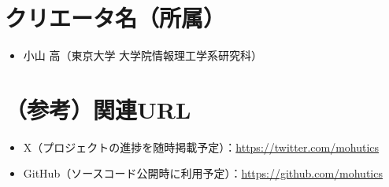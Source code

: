 \documentclass[uplatex,a4paper,12pt]{jsarticle}
\begin{document}
\section{クリエータ名（所属）}
\begin{itemize}
  \item 小山 高（東京大学 大学院情報理工学系研究科）
\end{itemize}

\section*{（参考）関連URL} %
\begin{itemize}
  \item X（プロジェクトの進捗を随時掲載予定）：\url{https://twitter.com/mohutics}
  \item GitHub（ソースコード公開時に利用予定）：\url{https://github.com/mohutics}
\end{itemize}
\end{document}
